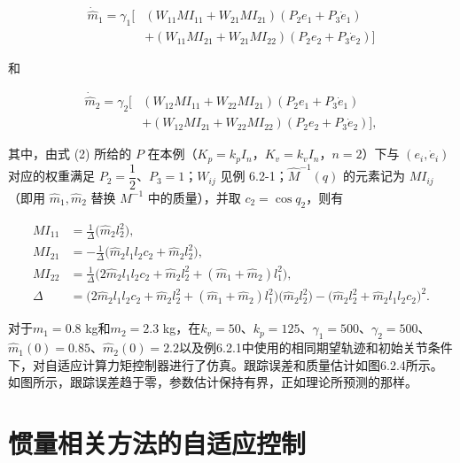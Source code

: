 \documentclass[12pt,a4paper]{ctexart}
\begin{document}
\begin{equation}\tag{5}
\begin{aligned}
\dot{\hat{m}}_1 = \gamma_1 \bigl[ &(W_{11} MI_{11} + W_{21} MI_{21})(P_2 e_1 + P_3 \dot{e}_1) \\
&+ (W_{11} MI_{21} + W_{21} MI_{22})(P_2 e_2 + P_3 \dot{e}_2) \bigr]
\end{aligned}
\end{equation}

和

\begin{equation}\tag{6}
\begin{aligned}
\dot{\hat{m}}_2 = \gamma_2 \bigl[ &(W_{12} MI_{11} + W_{22} MI_{21})(P_2 e_1 + P_3 \dot{e}_1) \\
&+ (W_{12} MI_{21} + W_{22} MI_{22})(P_2 e_2 + P_3 \dot{e}_2) \bigr],
\end{aligned}
\end{equation}

其中，由式 (2) 所给的 $P$ 在本例（$K_p = k_p I_n$，$K_v = k_v I_n$，$n = 2$）下与 $(e_i,\dot{e}_i)$ 对应的权重满足 $P_2 = \dfrac{1}{2}$、$P_3 = 1$；$W_{ij}$ 见例 6.2-1；$\hat{M}^{-1}(q)$ 的元素记为 $MI_{ij}$（即用 $\hat{m}_1,\hat{m}_2$ 替换 $M^{-1}$ 中的质量），并取 $c_2 = \cos q_2$，则有

\begin{align*}
MI_{11} &= \frac{1}{\Delta}\bigl(\hat{m}_2 l_2^2\bigr), \\
MI_{21} &= -\frac{1}{\Delta}\bigl(\hat{m}_2 l_1 l_2 c_2 + \hat{m}_2 l_2^2\bigr), \\
MI_{22} &= \frac{1}{\Delta}\bigl(2\hat{m}_2 l_1 l_2 c_2 + \hat{m}_2 l_2^2 + (\hat{m}_1 + \hat{m}_2) l_1^2\bigr), \\
\Delta &= \bigl(2\hat{m}_2 l_1 l_2 c_2 + \hat{m}_2 l_2^2 + (\hat{m}_1 + \hat{m}_2) l_1^2\bigr)\bigl(\hat{m}_2 l_2^2\bigr) - \bigl(\hat{m}_2 l_2^2 + \hat{m}_2 l_1 l_2 c_2\bigr)^2.
\end{align*}

对于$m_1 = 0.8$ kg和$m_2 = 2.3$ kg，在$k_v = 50$、$k_p = 125$、$\gamma_1 = 500$、$\gamma_2 = 500$、$\hat{m}_1(0) = 0.85$、$\hat{m}_2(0) = 2.2$以及例6.2.1中使用的相同期望轨迹和初始关节条件下，对自适应计算力矩控制器进行了仿真。跟踪误差和质量估计如图6.2.4所示。如图所示，跟踪误差趋于零，参数估计保持有界，正如理论所预测的那样。

\section{惯量相关方法的自适应控制}\label{sec:inertia-related}
\end{document}

